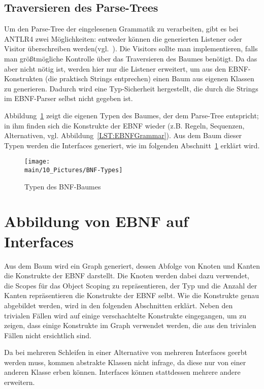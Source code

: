 \documentclass[../InterneDSLs.tex]{subfiles}
\begin{document}
\subsection{Traversieren des Parse-Trees}
Um den Parse-Tree der eingelesenen Grammatik zu verarbeiten, gibt es bei ANTLR4 zwei Möglichkeiten: entweder können die generierten Listener oder Visitor überschreiben werden(vgl.~\cite[S. 112 ff]{Parr.2012}). Die Visitors sollte man implementieren, falls man größtmögliche Kontrolle über das Traversieren des Baumes benötigt. Da das aber nicht nötig ist, werden hier nur die Listener erweitert, um aus den EBNF-Konstrukten (die praktisch Strings entprechen) einen Baum aus eigenen Klassen zu generieren. Dadurch wird eine Typ-Sicherheit hergestellt, die durch die Strings im EBNF-Parser selbst nicht gegeben ist.

Abbildung~\ref{FIG:TypesBNF} zeigt die eigenen Typen des Baumes, der dem Parse-Tree entspricht; in ihm finden sich die Konstrukte der EBNF wieder (z.B. Regeln, Sequenzen, Alternativen, vgl. Abbildung~\ref{LST:EBNFGrammar}). Aus dem Baum dieser Typen werden die Interfaces generiert, wie im folgenden Abschnitt~\ref{SEC:EBNFtoInterface} erklärt wird.

\begin{figure}[ht]
\centering
\texttt{[image: \\main/10\_Pictures/BNF-Types]}
\caption{Typen des BNF-Baumes}
\label{FIG:TypesBNF}
\end{figure}

\section{Abbildung von EBNF auf Interfaces}\label{SEC:EBNFtoInterface}
Aus dem Baum wird ein Graph generiert, dessen Abfolge von Knoten und Kanten die Konstrukte der EBNF darstellt. Die Knoten werden dabei dazu verwendet, die Scopes für das Object Scoping zu repräsentieren, der Typ und die Anzahl der Kanten repräsentieren die Konstrukte der EBNF selbt. Wie die Konstrukte genau abgebildet werden, wird in den folgenden Abschnitten erklärt. Neben den trivialen Fällen wird auf einige verschachtelte Konstrukte eingegangen, um zu zeigen, dass einige Konstrukte im Graph verwendet werden, die aus den trivialen Fällen nicht ersichtlich sind.

Da bei mehreren Schleifen in einer Alternative von mehreren Interfaces geerbt werden muss, kommen abstrakte Klassen nicht infrage, da diese nur von einer anderen Klasse erben können. Interfaces können stattdessen mehrere andere erweitern.
\end{document}

